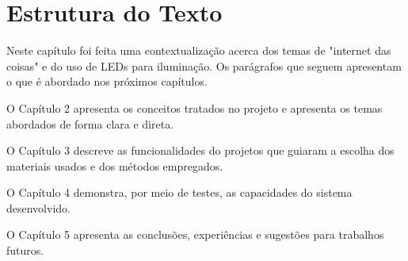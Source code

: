 \section{Estrutura do Texto}

Neste capítulo foi feita uma contextualização acerca dos temas de "internet das coisas" \space e do uso de LEDs para iluminação. Os parágrafos que seguem apresentam o que é abordado nos próximos capítulos.

O Capítulo 2 apresenta os conceitos tratados no projeto e apresenta os temas abordados de forma clara e direta.

O Capítulo 3 descreve as funcionalidades do projetos que guiaram a escolha dos materiais usados e dos métodos empregados.

O Capítulo 4 demonstra, por meio de testes, as capacidades do sistema desenvolvido.

O Capítulo 5 apresenta as conclusões, experiências e sugestões para trabalhos futuros.